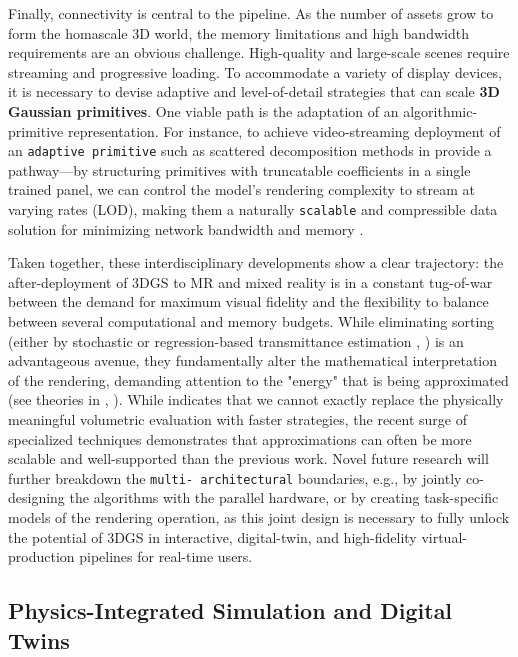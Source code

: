 \documentclass[11pt,a4paper]{article}
\begin{document}
Finally, connectivity is central to the pipeline. As the number of assets grow to form the homascale 3D world, the memory limitations and high bandwidth requirements are an obvious challenge. High-quality and large-scale scenes require streaming and progressive loading. To accommodate a variety of display devices, it is necessary to devise adaptive and level-of-detail strategies that can scale \textbf{3D Gaussian primitives}. One viable path is the adaptation of an algorithmic-primitive representation. For instance, to achieve video-streaming deployment of an \texttt{adaptive primitive} such as scattered decomposition methods in \cite{arxiv:2603.19834v3} provide a pathway---by structuring primitives with truncatable coefficients in a single trained panel, we can control the model's rendering complexity to stream at varying rates (LOD), making them a naturally \texttt{scalable} and compressible data solution for minimizing network bandwidth and memory \cite{arxiv:2605.15010v2}.

Taken together, these interdisciplinary developments show a clear trajectory: the after-deployment of 3DGS to MR and mixed reality is in a constant tug-of-war between the demand for maximum visual fidelity and the flexibility to balance between several computational and memory budgets. While eliminating sorting (either by stochastic or regression-based transmittance estimation \cite{arxiv:2503.24366v1}, \cite{arxiv:2506.07069v2}) is an advantageous avenue, they fundamentally alter the mathematical interpretation of the rendering, demanding attention to the "energy" that is being approximated (see theories in \cite{arxiv:2403.11056v2}, \cite{arxiv:2511.15102v1}). While \cite{arxiv:2410.18931v2} indicates that we cannot exactly replace the physically meaningful volumetric evaluation with faster strategies, the recent surge of specialized techniques demonstrates that approximations can often be more scalable and well-supported than the previous work. Novel future research will further breakdown the \texttt{multi- architectural} boundaries, e.g., by jointly co-designing the algorithms with the parallel hardware, or by creating task-specific models of the rendering operation, as this joint design is necessary to fully unlock the potential of 3DGS in interactive, digital-twin, and high-fidelity virtual-production pipelines for real-time users.


\subsection{Physics-Integrated Simulation and Digital Twins}
\end{document}
